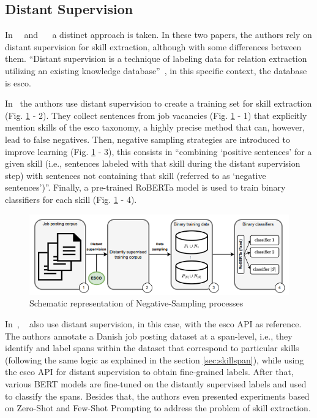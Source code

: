 \subsection{Distant Supervision}
\label{sec:supervision}
In~~\cite{zhang2022kompetencer} and ~~\cite{decorte2022design} a distinct approach is taken. In these two papers, the authors rely on distant supervision for skill extraction, although with some differences between them. 
“Distant supervision is a technique of labeling data for relation extraction utilizing an existing knowledge database”~\cite{10.1371/journal.pone.0216913}, in this specific context, the database is \ac{esco}.

In~\cite{decorte2022design} the authors use distant supervision to create a training set for skill extraction (Fig. \ref{fig:negative_sampling} - 2). They collect sentences from job vacancies (Fig. \ref{fig:negative_sampling} - 1) that explicitly mention skills of the \ac{esco} taxonomy, a highly precise method that can, however, lead to false negatives. Then, negative sampling strategies are introduced to improve learning (Fig. \ref{fig:negative_sampling} - 3), this consists in “combining ‘positive sentences’ for a given skill (i.e., sentences labeled with that skill during the distant supervision step) with sentences not containing that skill (referred to as ‘negative sentences’)”. Finally, a pre-trained RoBERTa model is used to train binary classifiers for each skill (Fig. \ref{fig:negative_sampling} - 4).

\begin{figure}[H]
    \centering
    \includegraphics[width=15cm]{figs/negative_sampling.png}
    \caption{Schematic representation of Negative-Sampling processes~\cite{decorte2022design}}
    \label{fig:negative_sampling}
\end{figure}

In~\cite{zhang2022kompetencer}, ~\citeauthor{zhang2022kompetencer} also use distant supervision, in this case, with the \ac{esco} API as reference. The authors annotate a Danish job posting dataset at a span-level, i.e., they identify and label spans within the dataset that correspond to particular skills (following the same logic as explained in the section \ref{sec:skillspan}), while using the \ac{esco} API for distant supervision to obtain fine-grained labels. After that, various BERT models are fine-tuned on the distantly supervised labels and used to classify the spans. Besides that, the authors even presented experiments based on Zero-Shot and Few-Shot Prompting to address the problem of skill extraction.

